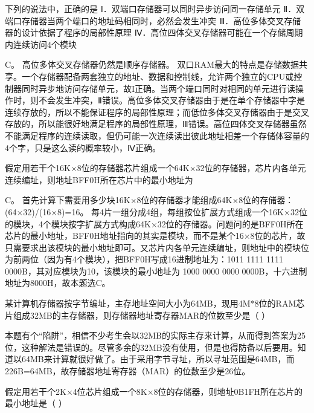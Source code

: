 \question 下列的说法中，正确的是 Ⅰ．双端口存储器可以同时异步访问同一存储单元
Ⅱ．双端口存储器当两个端口的地址码相同时，必然会发生冲突
Ⅲ．高位多体交叉存储器的设计依据了程序的局部性原理
Ⅳ．高位四体交叉存储器可能在一个存储周期内连续访问4个模块
\par{}
\begin{solution}C。 高位多体交叉存储器仍然是顺序存储器。
双口RAM最大的特点是存储数据共享。一个存储器配备两套独立的地址、数据和控制线，允许两个独立的CPU或控制器同时异步地访问存储单元，故I正确。当两个端口同时对相同的单元进行读操作时，则不会发生冲突，Ⅱ错误。高位多体交叉存储器由于是在单个存储器中字是连续存放的，所以不能保证程序的局部性原理；而低位多体交叉存储器由于是交叉存放的，所以能很好地满足程序的局部性原理，Ⅲ错误。高位四体交叉存储器虽然不能满足程序的连续读取，但仍可能一次连续读出彼此地址相差一个存储体容量的4个字，只是这么读的概率较小，Ⅳ正确。
\end{solution}
\question 假定用若干个16K×8位的存储器芯片组成一个64K×32位的存储器，芯片内各单元连续编址，则地址BFF0H所在芯片中的最小地址为
\par{}
\begin{solution}C。 首先计算下需要用多少块16K×8位的存储器才能组成64K×8位的存储器：
(64×32)/(16×8)=16。
每4片一组分成4组，每组按位扩展方式组成一个16K×32位的模块，4个模块按字扩展方式构成64K×32位的存储器。问题问的是BFF0H所在芯片的最小地址，BFF0H地址指向的其实是模块，而不是某个16×8位的芯片，故只需要求出该模块的最小地址即可。又芯片内各单元连续编址，则地址中的模块位为前两位（因为有4个模块），把BFF0H写成16进制地址为：1011
1111 1111 0000B，其对应模块为10，该模块的最小地址为 1000 0000 0000
0000B，十六进制地址为8000H，故本题选C。
\end{solution}
\question 某计算机存储器按字节编址，主存地址空间大小为64MB，现用4M*8位的RAM芯片组成32MB的主存储器，则存储器地址寄存器MAR的位数至少是（
）
\par{}
\begin{solution}本题有个``陷阱''，相信不少考生会以32MB的实际主存来计算，从而得到答案为25位，这种解法是错误的。尽管多余的32MB没有使用，但是也得防备以后要用。知道以64MB来计算就很好做了。由于采用字节寻址，所以寻址范围是64MB，而226B=64MB，故存储器地址寄存器（MAR）的位数至少是26位。
\end{solution}
\question 假定用若干个2K×4位芯片组成一个8K×8位的存储器，则地址0B1FH所在芯片的最小地址是（
）
\par{}
